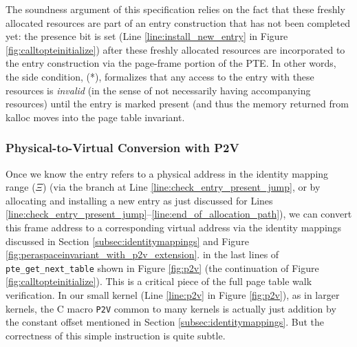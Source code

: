 The soundness argument of this specification relies on the fact that these freshly allocated resources are part 
of an entry construction that has not been completed yet: the presence bit is set 
(Line \ref{line:install_new_entry} in Figure \ref{fig:calltopteinitialize}) after these freshly allocated resources are incorporated to the 
entry construction via the page-frame portion of the PTE. In other words, the side condition, (*),
 formalizes that any access to the entry with these resources is \textit{invalid} (in the sense of not necessarily
having accompanying resources) until the entry is marked present (and thus the memory returned from \textsf{kalloc}
moves into the page table invariant.


\subsubsection{Physical-to-Virtual Conversion with \textsf{P2V}}
\label{sec:p2v}
Once we know the entry refers to a physical address in the identity mapping range ($\Xi$)
(via the branch at Line \ref{line:check_entry_present_jump}, or  by allocating and installing a new entry
as just discussed for Lines \ref{line:check_entry_present_jump}--\ref{line:end_of_allocation_path}), 
we can convert this frame address to a corresponding virtual address via the identity mappings
discussed in Section \ref{subsec:identitymappings} and Figure \ref{fig:peraspaceinvariant_with_p2v_extension}.
in the last lines of \lstinline|pte_get_next_table| shown in Figure \ref{fig:p2v} (the continuation of Figure \ref{fig:calltopteinitialize}).
This is a critical piece of the full page table walk verification.
In our small kernel (Line \ref{line:p2v} in Figure \ref{fig:p2v}), as in larger kernels, the C macro \texttt{P2V} common to many kernels
is actually just addition by the constant offset mentioned in Section \ref{subsec:identitymappings}.
But the correctness of this simple instruction is quite subtle.

